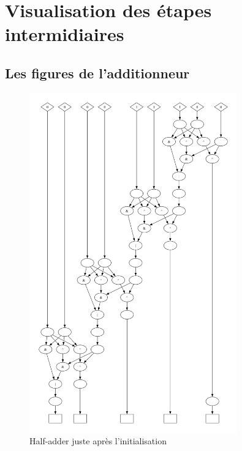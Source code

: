 \documentclass[a4paper,12pt]{article}
\begin{document}
\section{Visualisation des étapes intermidiaires}
\subsection{Les figures de l'additionneur}
\begin{figure}[H]
    \centering
    \includegraphics[width=0.8\textwidth]{figures/half_adder/adder_1-1.png}
    \caption{Half-adder juste après l'initialisation}
    \label{fig:half-adder-apres-initialisation}
\end{figure}
\end{document}
